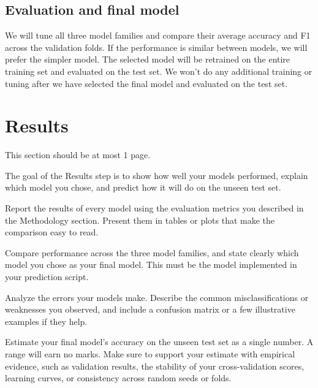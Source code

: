 \documentclass[12pt]{article}
\begin{document}
\subsection{Evaluation and final model}

We will tune all three model families and compare their average accuracy and F1 across 
the validation folds. If the performance is similar between models, we will prefer the simpler model.
The selected model will be retrained on the entire training set and evaluated on the test set.
We won't do any additional training or tuning after we have selected the final model and evaluated on the test set.

\section{Results}\label{sec:results}

This section should be at most 1 page.

The goal of the Results step is to show how well your models performed, explain which
model you chose, and predict how it will do on the unseen test set.

Report the results of every model using the evaluation metrics you described in the
Methodology section. Present them in tables or plots that make the comparison easy to
read.

Compare performance across the three model families, and state clearly which model you
chose as your final model. This must be the model implemented in your prediction script.

Analyze the errors your models make. Describe the common misclassifications or
weaknesses you observed, and include a confusion matrix or a few illustrative examples
if they help.

Estimate your final model's accuracy on the unseen test set as a single number. A range
will earn no marks. Make sure to support your estimate with empirical evidence, such as
validation results, the stability of your cross-validation scores, learning curves, or
consistency across random seeds or folds.
\end{document}
